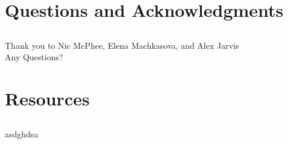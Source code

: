 \documentclass{beamer}
\begin{document}
\section*{Questions and Acknowledgments}
\subsection*{}
\begin{frame}
  \frametitle{}
\begin{center}
Thank you to Nic McPhee, Elena Machkasova, and Alex Jarvis\\
  \large Any Questions? 
\end{center}

\end{frame}

\section*{Resources}
\subsection*{}
\begin{frame}
  \frametitle{}
\begin{center}
  \large asdghdsa 
\end{center}
\end{frame}
\end{document}
